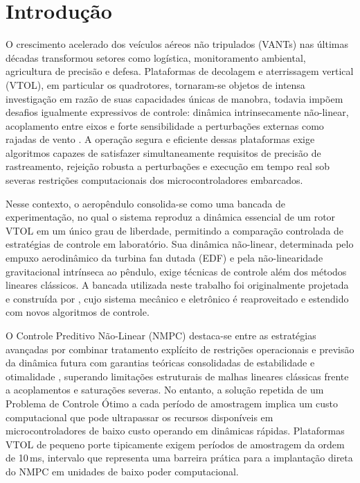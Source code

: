\chapter{Introdução}
\label{cap:introducao}

O crescimento acelerado dos veículos aéreos não tripulados (VANTs) nas últimas décadas transformou setores como logística, monitoramento ambiental, agricultura de precisão e defesa. Plataformas de decolagem e aterrissagem vertical (VTOL), em particular os quadrotores, tornaram-se objetos de intensa investigação em razão de suas capacidades únicas de manobra, todavia impõem desafios igualmente expressivos de controle: dinâmica intrinsecamente não-linear, acoplamento entre eixos e forte sensibilidade a perturbações externas como rajadas de vento \cite{nguyen2020}. A operação segura e eficiente dessas plataformas exige algoritmos capazes de satisfazer simultaneamente requisitos de precisão de rastreamento, rejeição robusta a perturbações e execução em tempo real sob severas restrições computacionais dos microcontroladores embarcados.

Nesse contexto, o aeropêndulo consolida-se como uma bancada de experimentação, no qual o sistema reproduz a dinâmica essencial de um rotor VTOL em um único grau de liberdade, permitindo a comparação controlada de estratégias de controle em laboratório. Sua dinâmica não-linear, determinada pelo empuxo aerodinâmico da turbina fan dutada (EDF) e pela não-linearidade gravitacional intrínseca ao pêndulo, exige técnicas de controle além dos métodos lineares clássicos. A bancada utilizada neste trabalho foi originalmente projetada e construída por , cujo sistema mecânico e eletrônico é reaproveitado e estendido com novos algoritmos de controle.

O Controle Preditivo Não-Linear (NMPC) destaca-se entre as estratégias avançadas por combinar tratamento explícito de restrições operacionais e previsão da dinâmica futura com garantias teóricas consolidadas de estabilidade e otimalidade \cite{mayne2000}, superando limitações estruturais de malhas lineares clássicas frente a acoplamentos e saturações severas. No entanto, a solução repetida de um Problema de Controle Ótimo a cada período de amostragem implica um custo computacional que pode ultrapassar os recursos disponíveis em microcontroladores de baixo custo operando em dinâmicas rápidas. Plataformas VTOL de pequeno porte tipicamente exigem períodos de amostragem da ordem de 10\,ms, intervalo que representa uma barreira prática para a implantação direta do NMPC em unidades de baixo poder computacional.

